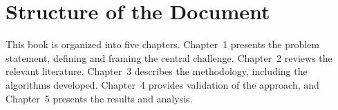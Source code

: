 \section*{Structure of the Document}

This book is organized into five chapters. Chapter~1 presents the
problem statement, defining and framing the central challenge.
Chapter~2 reviews the relevant literature. Chapter~3 describes the
methodology, including the algorithms developed. Chapter~4 provides
validation of the approach, and Chapter~5 presents the results and
analysis.